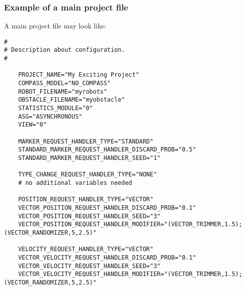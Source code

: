 \subsubsection{Example of a main project file}
A main project file may look like:
\lstset{language=tcl}
\begin{lstlisting}
# 
# Description about configuration.
#
	
	PROJECT_NAME="My Exciting Project"
	COMPASS_MODEL="NO_COMPASS"
	ROBOT_FILENAME="myrobots"
	OBSTACLE_FILENAME="myobstacle"
	STATISTICS_MODULE="0"
	ASG="ASYNCHRONOUS"
	VIEW="0"
	
	MARKER_REQUEST_HANDLER_TYPE="STANDARD"
	STANDARD_MARKER_REQUEST_HANDLER_DISCARD_PROB="0.5"
	STANDARD_MARKER_REQUEST_HANDLER_SEED="1"

	TYPE_CHANGE_REQUEST_HANDLER_TYPE="NONE"
	# no additional variables needed

	POSITION_REQUEST_HANDLER_TYPE="VECTOR"
	VECTOR_POSITION_REQUEST_HANDLER_DISCARD_PROB="0.1"
	VECTOR_POSITION_REQUEST_HANDLER_SEED="3"
	VECTOR_POSITION_REQUEST_HANDLER_MODIFIER="(VECTOR_TRIMMER,1.5);(VECTOR_RANDOMIZER,5,2.5)"

	VELOCITY_REQUEST_HANDLER_TYPE="VECTOR"
	VECTOR_VELOCITY_REQUEST_HANDLER_DISCARD_PROB="0.1"
	VECTOR_VELOCITY_REQUEST_HANDLER_SEED="3"
	VECTOR_VELOCITY_REQUEST_HANDLER_MODIFIER="(VECTOR_TRIMMER,1.5);(VECTOR_RANDOMIZER,5,2.5)"

\end{lstlisting}



